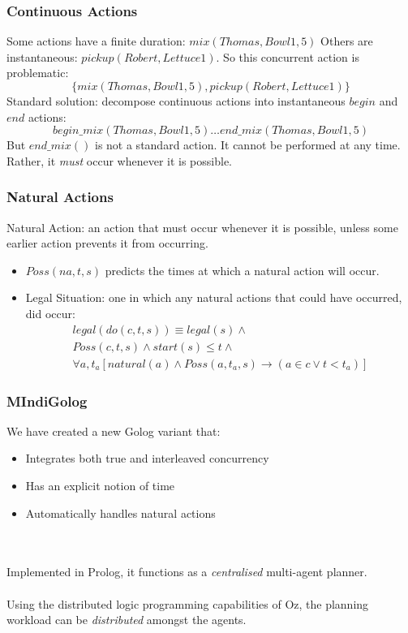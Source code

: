 \documentclass{beamer}
\begin{document}
\begin{frame}
\frametitle{Continuous Actions}
Some actions have a finite duration: $mix(Thomas,Bowl1,5)$
Others are instantaneous: $pickup(Robert,Lettuce1)$.
So this concurrent action is problematic:\[
\{mix(Thomas,Bowl1,5),pickup(Robert,Lettuce1)\}\]
Standard solution: decompose continuous actions into instantaneous $begin$
and $end$ actions:\[
begin\_mix(Thomas,Bowl1,5) \dots end\_mix(Thomas,Bowl1,5)\]
But $end\_mix()$ is not a standard action.  It cannot be performed at
any time.  Rather, it \emph{must} occur whenever it is possible.
\end{frame}

\begin{frame}
\frametitle{Natural Actions}
Natural Action:  an action that must occur whenever it is possible,
unless some earlier action prevents it from occurring.
\begin{itemize}
  \item $Poss(na,t,s)$ predicts the times at which a natural action will occur.
  \item Legal Situation: one in which any natural actions that could have occurred, did occur:\[
\begin{array}{c}
legal(do(c,t,s)) \equiv legal(s) \wedge\\
Poss(c,t,s) \wedge start(s) \leq t \wedge\\
\forall a,t_a [natural(a) \wedge Poss(a,t_a,s) \rightarrow (a \in c \vee t < t_a)]
\end{array}\]
\end{itemize}
\end{frame}

\begin{frame}
\frametitle{MIndiGolog}
We have created a new Golog variant that:
\begin{itemize}
  \item Integrates both true and interleaved concurrency
  \item Has an explicit notion of time
  \item Automatically handles natural actions
\end{itemize}
\ \\
\ \\
Implemented in Prolog, it functions as a \emph{centralised} multi-agent planner.
\ \\
\ \\
Using the distributed logic programming capabilities of Oz, the planning
workload can be \emph{distributed} amongst the agents.
\end{frame}
\end{document}
